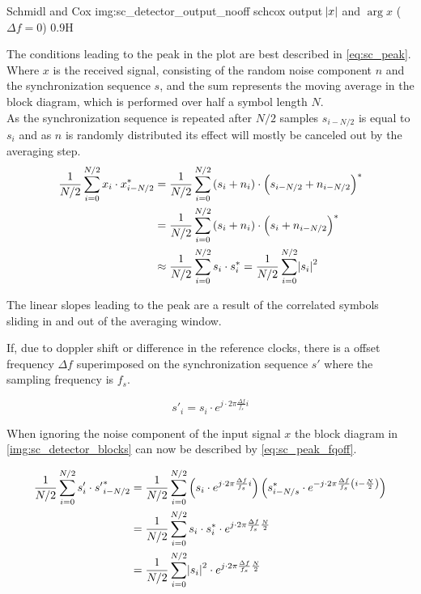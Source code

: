 \begin{subchapter}{Schmidl and Cox}
               {img:sc_detector_output_nooff}
               {\acrshort{schcox} output $\abs{x}$ and $\arg{x}$ ($\Delta f=0$)}
               {0.9}{H}

  The conditions leading to the peak in the plot are best
  described in \autoref{eq:sc_peak}.
  Where $x$ is the received signal, consisting of the
  random noise component $n$ and the synchronization sequence $s$,
  and the sum represents the moving average in the block diagram,
  which is performed over half a symbol length $N$. \\

  As the synchronization sequence is repeated after $N/2$ samples
  $s_{i-N/2}$ is equal to $s_{i}$ and as $n$ is randomly distributed
  its effect will mostly be canceled out by the averaging step. \\

  \begin{align}
    \label{eq:sc_peak}
    \frac{1}{N/2} \sum_{i=0}^{N/2} x_{i} \cdot x_{i-N/2}^\ast &=
    \frac{1}{N/2} \sum_{i=0}^{N/2} \left(s_{i} + n_{i} \right) \cdot \left(s_{i-N/2} + n_{i-N/2} \right)^\ast \nonumber \\
    &= \frac{1}{N/2} \sum_{i=0}^{N/2} \left(s_{i} + n_{i} \right) \cdot \left(s_{i} + n_{i-N/2} \right)^\ast \nonumber \\
    &\approx \frac{1}{N/2} \sum_{i=0}^{N/2} s_{i} \cdot s_{i}^\ast
    = \frac{1}{N/2} \sum_{i=0}^{N/2} \abs{s_{i}}^2
  \end{align}

  The linear slopes leading to the peak are a result of the
  correlated symbols sliding in and out of the averaging
  window.

  If, due to doppler shift or difference in the reference clocks,
  there is a offset frequency $\Delta f$ superimposed on the
  synchronization sequence $s'$ where the sampling frequency is $f_s$.

  \begin{equation*}
    s'_{i}= s_{i} \cdot e^{j\cdot 2 \pi \frac{\Delta f}{f_s}i}
  \end{equation*}

  When ignoring the noise component of the input signal $x$ the
  block diagram in \autoref{img:sc_detector_blocks} can
  now be described by \autoref{eq:sc_peak_fqoff}.

  \begin{align}
    \label{eq:sc_peak_fqoff}
    \frac{1}{N/2} \sum_{i=0}^{N/2} s'_{i} \cdot {s'}_{i-N/2}^{\ast}
    &= \frac{1}{N/2} \sum_{i=0}^{N/2}
     \left( s_{i} \cdot e^{j\cdot 2 \pi \frac{\Delta f}{f_s}i} \right)
     \left( s_{i-N/s}^{\ast} \cdot e^{-j\cdot 2 \pi \frac{\Delta f}{f_s} \left( i- \frac{N}{2} \right)} \right) \nonumber \\
    &= \frac{1}{N/2} \sum_{i=0}^{N/2} s_{i} \cdot s_{i}^\ast \cdot e^{j\cdot 2 \pi \frac{\Delta f}{f_s} \frac{N}{2}} \nonumber \\
    &= \frac{1}{N/2} \sum_{i=0}^{N/2} \abs{s_{i}}^2 \cdot e^{j\cdot 2 \pi \frac{\Delta f}{f_s} \frac{N}{2}}
  \end{align}


\end{subchapter}
